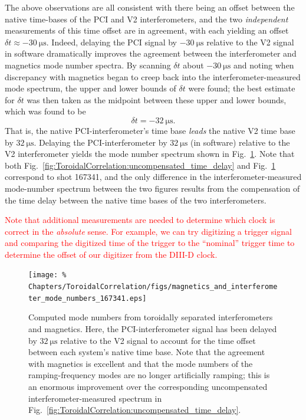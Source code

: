 The above observations are all consistent with there being an offset
between the native time-bases of the PCI and V2 interferometers, and
the two \emph{independent} measurements of this time offset are in agreement,
with each yielding an offset $\delta t \approx \SI{-30}{\micro\second}$.
Indeed, delaying the PCI signal by $-\SI{30}{\micro\second}$
relative to the V2 signal in software dramatically improves
the agreement between the interferometer and magnetics mode number spectra.
By scanning $\delta t$ about $-\SI{30}{\micro\second}$ and
noting when discrepancy with magnetics began to creep back into
the interferometer-measured mode spectrum,
the upper and lower bounds of $\delta t$ were found;
the best estimate for $\delta t$ was then taken as the midpoint
between these upper and lower bounds, which was found to be
\begin{equation}
  \delta t = -\SI{32}{\micro\second}.
  \label{eq:ToroidalCorrelation:time_delay}
\end{equation}
That is, the native PCI-interferometer's time base \emph{leads}
the native V2 time base by $\SI{32}{\micro\second}$.
Delaying the PCI-interferometer by $\SI{32}{\micro\second}$ (in software)
relative to the V2 interferometer yields the mode number spectrum
shown in Fig.~\ref{fig:ToroidalCorrelation:compensated_time_delay}.
Note that both
Fig.~\ref{fig:ToroidalCorrelation:uncompensated_time_delay} and
Fig.~\ref{fig:ToroidalCorrelation:compensated_time_delay}
correspond to shot 167341, and
the only difference in the interferometer-measured mode-number spectrum
between the two figures results from the compensation of the time delay
between the native time bases of the two interferometers.

\textcolor{red}{Note that additional measurements are needed
to determine which clock is correct in the \emph{absolute} sense.
For example, we can try digitizing a trigger signal and
comparing the digitized time of the trigger to the ``nominal'' trigger time
to determine the offset of our digitizer from the DIII-D clock.}

\begin{figure}
  \centering
  \texttt{[image: \%
    Chapters/ToroidalCorrelation/figs/magnetics\_and\_interferometer\_mode\_numbers\_167341.eps]}
  \caption[Computed toroidal mode numbers \emph{after} removing time delay
      from Fig.~\ref{fig:ToroidalCorrelation:uncompensated_time_delay}]{%
    Computed mode numbers from
    toroidally separated interferometers and magnetics.
    Here, the PCI-interferometer signal has been delayed by
    $\SI{32}{\micro\second}$ relative to the V2 signal
    to account for the time offset between each system's native time base.
    Note that the agreement with magnetics is excellent and that
    the mode numbers of the ramping-frequency modes are no longer
    artificially ramping;
    this is an enormous improvement over the corresponding
    uncompensated interferometer-measured spectrum in
    Fig.~\ref{fig:ToroidalCorrelation:uncompensated_time_delay}.}
\label{fig:ToroidalCorrelation:compensated_time_delay}
\end{figure}


